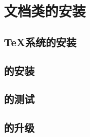 \chapter{文档类的安装}\label{chapter:installtion}

\section{\TeX 系统的安装}

\section{\njuthesis 的安装}

\section{\njuthesis 的测试}

\section{\njuthesis 的升级}
